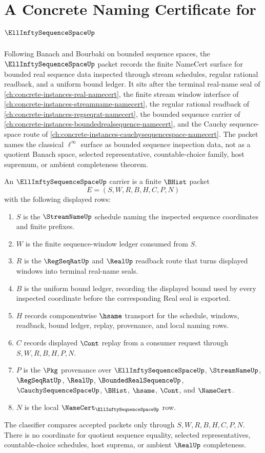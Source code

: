 \chapter{A Concrete Naming Certificate for $\EllInftySequenceSpaceUp$}
\label{ch:concrete-instances-ell-infty-sequence-space-namecert}

Following Banach and Bourbaki on bounded sequence spaces, the $\EllInftySequenceSpaceUp$ packet records the finite NameCert surface for bounded real sequence data inspected through stream schedules, regular rational readback, and a uniform bound ledger. It sits after the terminal real-name seal of \autoref{ch:concrete-instances-real-namecert}, the finite stream window interface of \autoref{ch:concrete-instances-streamname-namecert}, the regular rational readback of \autoref{ch:concrete-instances-regseqrat-namecert}, the bounded sequence carrier of \autoref{ch:concrete-instances-boundedrealsequence-namecert}, and the Cauchy sequence-space route of \autoref{ch:concrete-instances-cauchysequencespace-namecert}. The packet names the classical $\ell^\infty$ surface as bounded sequence inspection data, not as a quotient Banach space, selected representative, countable-choice family, host supremum, or ambient completeness theorem.

\begin{definition}
\label{def:ell-infty-sequence-space-carrier}
An $\EllInftySequenceSpaceUp$ carrier is a finite $\BHist$ packet
$$
E=(S,W,R,B,H,C,P,N)
$$
with the following displayed rows:
\begin{enumerate}
\item $S$ is the $\StreamNameUp$ schedule naming the inspected sequence coordinates and finite prefixes.
\item $W$ is the finite sequence-window ledger consumed from $S$.
\item $R$ is the $\RegSeqRatUp$ and $\RealUp$ readback route that turns displayed windows into terminal real-name seals.
\item $B$ is the uniform bound ledger, recording the displayed bound used by every inspected coordinate before the corresponding Real seal is exported.
\item $H$ records componentwise $\hsame$ transport for the schedule, windows, readback, bound ledger, replay, provenance, and local naming rows.
\item $C$ records displayed $\Cont$ replay from a consumer request through $S,W,R,B,H,P,N$.
\item $P$ is the $\Pkg$ provenance over $\EllInftySequenceSpaceUp$, $\StreamNameUp$, $\RegSeqRatUp$, $\RealUp$, $\BoundedRealSequenceUp$, $\CauchySequenceSpaceUp$, $\BHist$, $\hsame$, $\Cont$, and $\NameCert$.
\item $N$ is the local $\NameCert_{\EllInftySequenceSpaceUp}$ row.
\end{enumerate}
The classifier compares accepted packets only through $S,W,R,B,H,C,P,N$. There is no coordinate for quotient sequence equality, selected representatives, countable-choice schedules, host suprema, or ambient $\RealUp$ completeness.
\end{definition}


